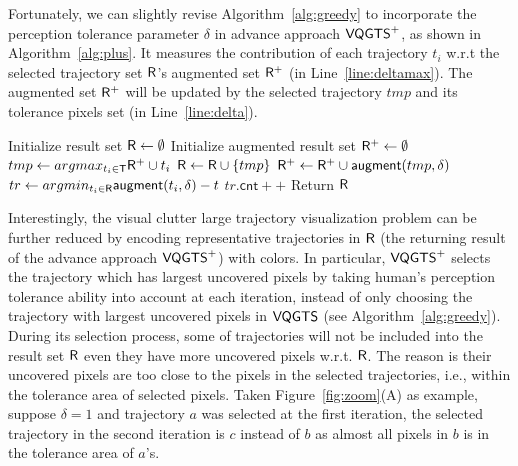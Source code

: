 Fortunately, we can slightly revise Algorithm~\ref{alg:greedy} to incorporate the perception tolerance parameter $\delta$ in advance approach $\mathsf{VQGTS}^{+}$, as shown in Algorithm~\ref{alg:plus}.
It measures the contribution of each trajectory $t_i$ w.r.t the selected trajectory set $\mathsf{R}$'s augmented set $\mathsf{R}^{+}$ (in Line~\ref{line:deltamax}).
The augmented set $\mathsf{R}^{+}$ will be updated by the selected trajectory $tmp$ and its tolerance pixels set (in Line~\ref{line:delta}).


\begin{algorithm}
    \caption{$\avats(\D,k=\alpha |\D|,\delta)$} \label{alg:plus}
    \begin{algorithmic}[1]
    \State Initialize result set $\mathsf{R} \leftarrow \emptyset$
    \State Initialize augmented result set $\mathsf{R}^{+} \leftarrow \emptyset$
        \State $tmp \leftarrow argmax_{t_i \in \mathsf{T}} \mathsf{R}^{+} \cup t_i$ \label{line:deltamax}
        \State $\mathsf{R} \leftarrow \mathsf{R} \cup \{ tmp \}$
        \State $\mathsf{R}^{+} \leftarrow \mathsf{R}^{+} \cup \mathsf{augment}(tmp, \delta)$\label{line:delta}
    \EndWhile
      \label{line:s}
        \State $tr \leftarrow argmin_{t_i \in \mathsf{R}}{\mathsf{augment}(t_i, \delta) - t}$
        \State $tr.\mathsf{cnt}++$ \label{line:e}
    \EndFor
    \State Return $\mathsf{R}$
    \end{algorithmic}
\end{algorithm}

Interestingly, the visual clutter large trajectory visualization problem can be further reduced
by encoding representative trajectories in $\mathsf{R}$ (the returning result of the advance approach $\mathsf{VQGTS}^{+}$) with colors.
In particular, $\mathsf{VQGTS}^{+}$ selects the trajectory which has largest uncovered pixels by taking human's perception tolerance ability into account at each iteration,
instead of only choosing the trajectory with largest uncovered pixels in $\mathsf{VQGTS}$ (see Algorithm~\ref{alg:greedy}).
During its selection process, some of trajectories will not be included into the result set $\mathsf{R}$ even they have more uncovered pixels w.r.t. $\mathsf{R}$.
The reason is their uncovered pixels are too close to the pixels in the selected trajectories, i.e., within the tolerance area of selected pixels.
Taken Figure~\ref{fig:zoom}(A) as example, suppose $\delta=1$ and trajectory $a$ was selected at the first iteration,
the selected trajectory in the second iteration is $c$ instead of $b$ as almost all pixels in $b$ is in the tolerance area of $a$'s.

